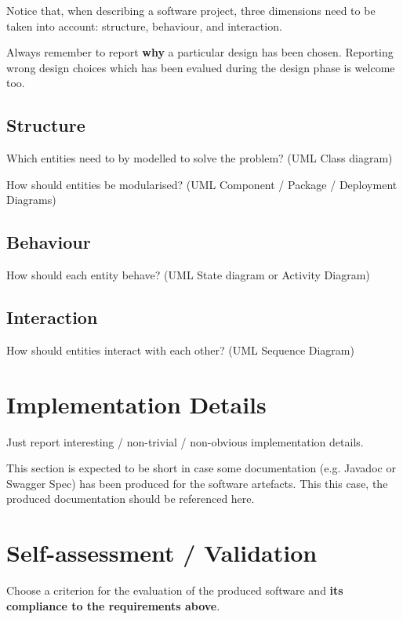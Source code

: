 \documentclass{scrartcl}
\begin{document}
    Notice that, when describing a software project, three dimensions need to be taken into account: structure, behaviour, and interaction.

    Always remember to report \textbf{why} a particular design has been chosen.
    Reporting wrong design choices which has been evalued during the design phase is welcome too.

    \subsection{Structure}

    Which entities need to by modelled to solve the problem?
%
    (UML Class diagram)

    How should entities be modularised?
%
    (UML Component / Package / Deployment Diagrams)

    \subsection{Behaviour}

    How should each entity behave?
%
    (UML State diagram or Activity Diagram)

    \subsection{Interaction}

    How should entities interact with each other?
%
    (UML Sequence Diagram)


    \section{Implementation Details}

    Just report interesting / non-trivial / non-obvious implementation details.

    This section is expected to be short in case some documentation (e.g. Javadoc or Swagger Spec) has been produced for the software artefacts.
%
    This this case, the produced documentation should be referenced here.


    \section{Self-assessment / Validation}

    Choose a criterion for the evaluation of the produced software and \textbf{its compliance to the requirements above}.
\end{document}
